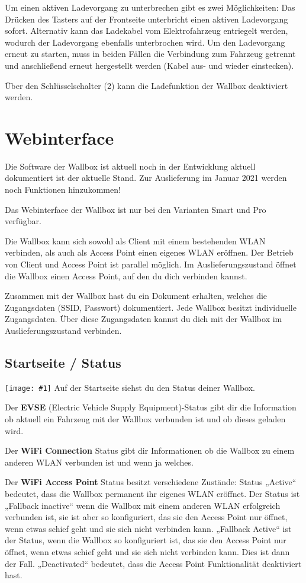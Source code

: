 \documentclass[a4paper,10pt]{article}
\newcommand{\hint}[1]{\begin{tcolorbox}[colback=boxgray,colframe=black,coltext=
white,title=Hinweis]#1\end{tcolorbox}}
\newcommand{\gfx}[1]{\texttt{[image: \#1]}}
\begin{document}
\begin{multicols*}{2}
	Um einen aktiven Ladevorgang zu unterbrechen gibt es zwei Möglichkeiten: Das
	Drücken des Tasters auf der Frontseite unterbricht einen aktiven Ladevorgang
	sofort. Alternativ kann das Ladekabel vom Elektrofahrzeug entriegelt werden,
	wodurch der Ladevorgang ebenfalls unterbrochen wird. Um den Ladevorgang erneut
	zu starten, muss in beiden Fällen die Verbindung zum Fahrzeug getrennt und
	anschließend erneut hergestellt werden (Kabel aus- und wieder einstecken).

	Über den Schlüsselschalter (2) kann die Ladefunktion der Wallbox deaktiviert
	werden.

	\section{Webinterface}
	\hint{Die Software der Wallbox ist aktuell noch in der Entwicklung aktuell
		dokumentiert ist der aktuelle Stand. Zur Auslieferung im Januar 2021 werden
		noch Funktionen hinzukommen!}
	Das Webinterface der Wallbox ist nur bei den Varianten Smart und Pro verfügbar.

	Die Wallbox kann sich sowohl als Client mit einem bestehenden WLAN verbinden,
	als auch als Access Point einen eigenes WLAN eröffnen. Der Betrieb von Client
	und Access Point ist parallel möglich. Im Auslieferungszustand öffnet die
	Wallbox einen Access Point, auf den du dich verbinden kannst.

	Zusammen mit der Wallbox hast du ein Dokument erhalten, welches die
	Zugangsdaten (SSID, Passwort) dokumentiert. Jede Wallbox besitzt individuelle
	Zugangsdaten.  Über diese Zugangsdaten kannst du dich mit der Wallbox im
	Auslieferungszustand verbinden.

	\subsection{Startseite / Status}
	\gfx{./img/resized/web_status}
	Auf der Startseite siehst du den Status deiner Wallbox.

	Der \textbf{EVSE} (Electric Vehicle Supply Equipment)-Status gibt dir die Information ob aktuell ein
	Fahrzeug mit der Wallbox verbunden ist und ob dieses geladen wird.

	Der \textbf{WiFi Connection} Status gibt dir Informationen ob die Wallbox zu
	einem anderen WLAN verbunden ist und wenn ja welches.

	Der \textbf{WiFi Access Point} Status besitzt verschiedene Zustände: Status
	„Active“ bedeutet, dass die Wallbox permanent ihr eigenes WLAN eröffnet. Der
	Status ist „Fallback inactive“ wenn die Wallbox mit einem anderen WLAN
	erfolgreich verbunden ist, sie ist aber so konfiguriert, das sie den Access
	Point nur öffnet, wenn etwas schief geht und sie sich nicht verbinden kann.
	„Fallback Active“ ist der Status, wenn die Wallbox so konfiguriert ist, das sie
	den Access Point nur öffnet, wenn etwas schief geht und sie sich nicht
	verbinden kann. Dies ist dann der Fall. „Deactivated“ bedeutet, dass die Access
	Point Funktionalität deaktiviert hast.


\end{multicols*}
\end{document}
